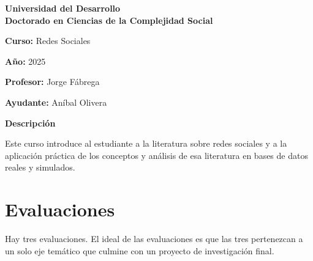 \documentclass[12pt]{article}
\begin{document}
\textbf{Universidad del Desarrollo} \\
\textbf{Doctorado en Ciencias de la Complejidad Social}

\vspace{1cm}

\textbf{Curso:} Redes Sociales

\textbf{Año:} 2025

\textbf{Profesor:} Jorge Fábrega

\textbf{Ayudante:} Aníbal Olivera

\vspace{0.5cm}

\textbf{Descripción} 

Este curso introduce al estudiante a la literatura sobre redes sociales y a la aplicación práctica de los conceptos y análisis de esa literatura en bases de datos reales y simulados.

\vspace{0.5cm}

\section{Evaluaciones}

\vspace{0.5cm}

Hay tres evaluaciones. El ideal de las evaluaciones es que las tres pertenezcan a un solo eje temático que culmine con un proyecto de investigación final. 
\end{document}
